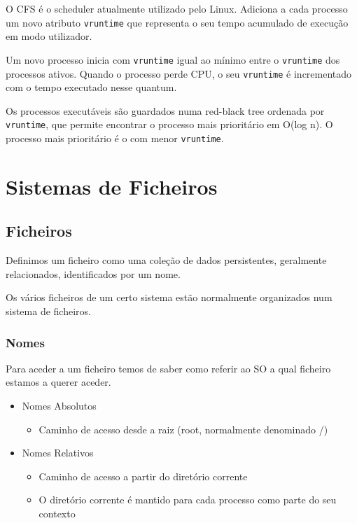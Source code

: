 \documentclass[11pt]{article}
\begin{document}
O CFS é o scheduler atualmente utilizado pelo Linux. Adiciona a cada processo um novo atributo \lstinline|vruntime| que representa o seu tempo acumulado de execução em modo utilizador.

Um novo processo inicia com \lstinline|vruntime| igual ao mínimo entre o \lstinline|vruntime| dos processos ativos. Quando o processo perde CPU, o seu \lstinline|vruntime| é incrementado com o tempo executado nesse quantum.

Os processos executáveis são guardados numa red-black tree ordenada por \lstinline|vruntime|, que permite encontrar o processo mais prioritário em O(log n). O processo mais prioritário é o com menor \lstinline|vruntime|.

\newpage

\section{Sistemas de Ficheiros}

\subsection{Ficheiros}

Definimos um ficheiro como uma coleção de dados persistentes, geralmente relacionados, identificados por um nome.

Os vários ficheiros de um certo sistema estão normalmente organizados num sistema de ficheiros.

\subsubsection{Nomes}

Para aceder a um ficheiro temos de saber como referir ao SO a qual ficheiro estamos a querer aceder.

\begin{itemize}
    \item Nomes Absolutos
          \begin{itemize}
              \item Caminho de acesso desde a raiz (root, normalmente denominado /)
          \end{itemize}
    \item Nomes Relativos
          \begin{itemize}
              \item Caminho de acesso a partir do diretório corrente
              \item O diretório corrente é mantido para cada processo como parte do seu contexto
          \end{itemize}
\end{itemize}
\end{document}
